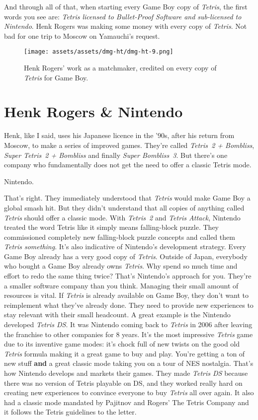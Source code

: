 \documentclass{book}
\begin{document}
And through all of that, when starting every Game Boy copy of \emph{Tetris}, the first words you see are: \emph{Tetris licensed to Bullet-Proof Software and sub-licensed to Nintendo}. Henk Rogers was making some money with every copy of \emph{Tetris}. Not bad for one trip to Moscow on Yamauchi’s request.

\begin{figure}[hbt]
\vskip 10pt
\centering \texttt{[image: assets/assets/dmg-ht/dmg-ht-9.png]}\par\pagetwodescription Henk Rogers’ work as a matchmaker, credited on every copy of \emph{Tetris} for Game Boy.
\vskip 6pt
\end{figure}

\FloatBarrier\needspace{10mm}\section*{Henk Rogers \& Nintendo}\nopagebreak[4]

Henk, like I said, uses his Japanese licence in the ’90s, after his return from Moscow, to make a series of improved games. They’re called \emph{Tetris 2 + Bombliss}, \emph{Super Tetris 2 + Bombliss} and finally \emph{Super Bombliss 3}. But there’s one company who fundamentally does not get the need to offer a classic Tetris mode.

Nintendo.

That’s right. They immediately understood that \emph{Tetris} would make Game Boy a global smash hit. But they didn’t understand that all copies of anything called \emph{Tetris} should offer a classic mode. With \emph{Tetris 2} and \emph{Tetris Attack}, Nintendo treated the word Tetris like it simply means falling-block puzzle. They commissioned completely new falling-block puzzle concepts and called them \emph{Tetris something}. It’s also indicative of Nintendo’s development strategy. Every Game Boy already has a very good copy of \emph{Tetris}. Outside of Japan, everybody who bought a Game Boy already owns \emph{Tetris}. Why spend so much time and effort to redo the same thing twice? That’s Nintendo’s approach for you. They’re a smaller software company than you think. Managing their small amount of resources is vital. If \emph{Tetris} is already available on Game Boy, they don’t want to reimplement what they’ve already done. They need to provide new experiences to stay relevant with their small headcount. A great example is the Nintendo developed \emph{Tetris DS}. It was Nintendo coming back to \emph{Tetris} in 2006 after leaving the franchise to other companies for 8 years. It’s the most impressive \emph{Tetris} game due to its inventive game modes: it’s chock full of new twists on the good old \emph{Tetris} formula making it a great game to buy and play. You’re getting a ton of new stuff \textbf{and} a great classic mode taking you on a tour of NES nostalgia. That’s how Nintendo develops and markets their games. They made \emph{Tetris DS} because there was no version of Tetris playable on DS, and they worked really hard on creating new experiences to convince everyone to buy \emph{Tetris} all over again. It also had a classic mode mandated by Pajitnov and Rogers’ The Tetris Company and it follows the Tetris guidelines to the letter.
\end{document}
